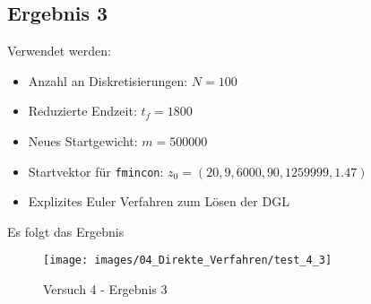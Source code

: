 \subsection{Ergebnis 3}
Verwendet werden:
\begin{itemize}
\item Anzahl an Diskretisierungen: $N = 100$ 
\item Reduzierte Endzeit: $t_f = 1800$
\item Neues Startgewicht: $m = 500000$
\item Startvektor für \texttt{fmincon}: $z_0 = (20,9,6000,90,1259999,1.47)$
\item Explizites Euler Verfahren zum Lösen der DGL
\end{itemize}
Es folgt das Ergebnis
\begin{figure}[H]
\begin{center}
\texttt{[image: images/04\_Direkte\_Verfahren/test\_4\_3]}
\caption{Versuch 4 - Ergebnis 3}\label{img:test_4_3}
\end{center}
\end{figure}







%





%
%







%
